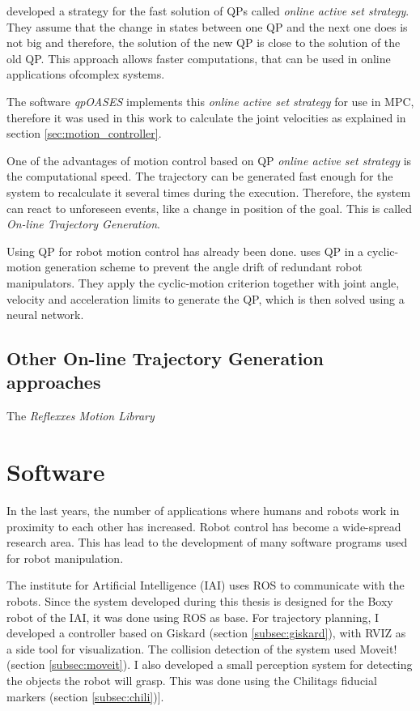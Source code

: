 \citet{qp_algorithm} developed a strategy for the fast solution of QPs called \textit{online active set strategy}. They assume that the change in states between one QP and the next one does is not big and therefore, the solution of the new QP is close to the solution of the old QP. This approach allows faster computations, that can be used in online applications ofcomplex systems.
 
The software \textit{qpOASES} implements this \textit{online active set strategy} for use in MPC, therefore it was used in this work to calculate the joint velocities as explained in section \ref{sec:motion_controller}.

One of the advantages of motion control based on QP \textit{online active set strategy} is the computational speed. The trajectory can be generated fast enough for the system to recalculate it several times during the execution. Therefore, the system can react to unforeseen events, like a change in position of the goal. This is called \textit{On-line Trajectory Generation}.

Using QP for robot motion control has already been done. \cite{acc_level_control} uses QP in a cyclic-motion generation scheme to prevent the angle drift of redundant robot manipulators. They apply the cyclic-motion criterion together with joint angle, velocity and acceleration limits to generate the QP, which is then solved using a neural network.

\subsection{Other On-line Trajectory Generation approaches}

The \textit{Reflexxes Motion Library}

\section{Software}
In the last years, the number of applications where humans and robots work in proximity to each other has increased. Robot control has become a wide-spread research area. This has lead to the development of many software programs used for robot manipulation. 

The  institute for Artificial Intelligence (IAI) uses ROS to communicate with the robots. Since the system developed during this thesis is designed for the Boxy robot of the IAI, it was done using ROS as base. For trajectory planning, I developed a controller based on Giskard (section \ref{subsec:giskard}), with RVIZ as a side tool for visualization. The collision detection of the system used Moveit! (section \ref{subsec:moveit}). I also developed a small perception system for detecting the objects the robot will grasp. This was done using the Chilitags fiducial markers (section \ref{subsec:chili})].

